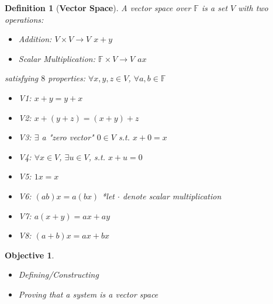 \documentclass[12pt]{article}
\newtheorem{definition}{Definition}[subsection]
\newtheorem{objective}{Objective}[subsection]
\begin{document}
	\begin{definition}[\textbf{Vector Space}]
		A vector space over $\mathbb{F}$ is a set $V$ with two operations: 
		\begin{itemize}
			\item Addition: $V\times V \to V$ $x + y$
			\item Scalar Multiplication: $\mathbb{F} \times V \to V$ $ax$
		\end{itemize}
		satisfying $8$ properties: $\forall x, y, z \in V$, $\forall a,b\in 
		\mathbb{F}$
		\begin{itemize}
			\item V1: $x + y = y + x$ 
			\item V2: $x + (y + z) = (x+ y) + z$
			\item V3: $\exists$ a "zero vector" $0\in V $ s.t. $x+0=x$ 
			\item V4: $\forall x\in V$, $\exists u\in V$, s.t. $x+u=0$
			\item V5: $1 x=x$ 
			\item V6: $(ab) x = a(bx)$ 
					*let $\cdot$ denote scalar multiplication
			\item V7: $a(x+y) = ax+ay$		
			\item V8: $(a+b)x = ax+bx$\\
		\end{itemize}
	\end{definition}

	\begin{objective}
		$ $
		\begin{itemize}
		\item Defining/Constructing 
		\item Proving that a system is a vector space\\
		\end{itemize}
	\end{objective}
\end{document}
